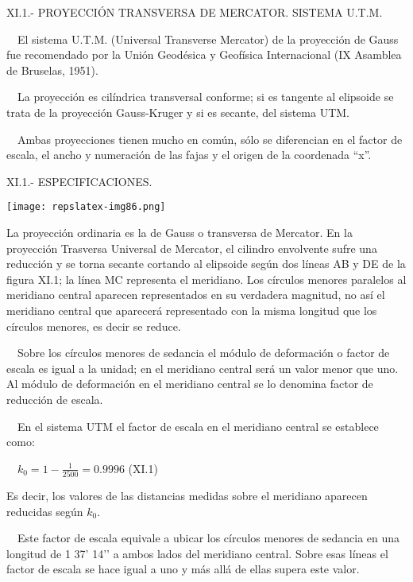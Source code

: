 \documentclass{tufte-book}
\begin{document}
XI.1.- PROYECCIÓN TRANSVERSA DE MERCATOR. SISTEMA U.T.M.

\ \ El sistema U.T.M. (Universal Transverse Mercator) de la proyección
de Gauss fue recomendado por la Unión Geodésica y Geofísica
Internacional (IX Asamblea de Bruselas, 1951).

\ \ La proyección es cilíndrica transversal conforme; si es tangente
al elipsoide se trata de la proyección Gauss-Kruger y si es secante,
del sistema UTM.

\ \ Ambas proyecciones tienen mucho en común, sólo se diferencian en
el factor de escala, el ancho y numeración de las fajas y el origen
de la coordenada {\textquotedblleft}x{\textquotedblright}.

XI.1.- ESPECIFICACIONES.

\begin{marginfigure}
\texttt{[image: repslatex-img86.png]}
\end{marginfigure}

La proyección ordinaria es la de Gauss o transversa de Mercator. En la
proyección Trasversa Universal de Mercator, el cilindro envolvente
sufre una reducción y se torna secante cortando al elipsoide según
dos líneas AB y DE de la figura XI.1; la línea MC representa el
meridiano. Los círculos menores paralelos al meridiano central
aparecen representados en su verdadera magnitud, no así el meridiano
central que aparecerá representado con la misma longitud que los
círculos menores, es decir se reduce.

\ \ Sobre los círculos menores de sedancia el módulo de
deformación o factor de escala es igual a la unidad; en el meridiano
central será un valor menor que uno. Al módulo de deformación en
el meridiano central se lo denomina factor de reducción de escala.

\ \ En el sistema UTM el factor de escala en el meridiano central se
establece como:

\ \  ${k_{{0}}=1-\frac{1}{\text{2500}}=0\text{.}\text{9996}}$  (XI.1)

Es decir, los valores de las distancias medidas sobre el meridiano
aparecen reducidas según  ${k_{{0}}}$.

\ \ Este factor de escala equivale a ubicar los círculos menores de
sedancia en una longitud de 1{\textordmasculine} 37{\textquoteright}
14{\textquoteright}{\textquoteright} a ambos lados del meridiano
central. Sobre esas líneas el factor de escala se hace igual a uno y
más allá de ellas supera este valor.
\end{document}
